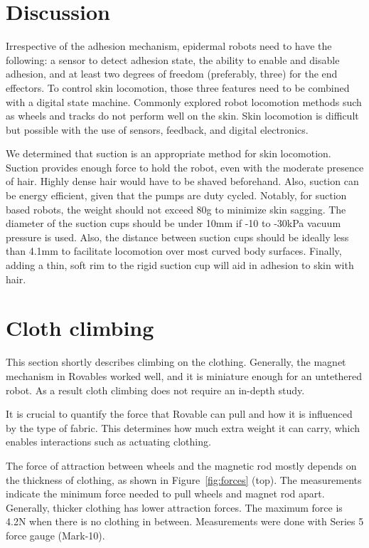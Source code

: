 \section{Discussion}
Irrespective of the adhesion mechanism, epidermal robots need to have the following: a sensor to detect adhesion state, the ability to enable and disable adhesion, and at least two degrees of freedom (preferably, three) for the end effectors. To control skin locomotion, those three features need to be combined with a digital state machine. Commonly explored robot locomotion methods such as wheels and tracks do not perform well on the skin. Skin locomotion is difficult but possible with the use of sensors, feedback, and digital electronics. 

We determined that suction is an appropriate method for skin locomotion. Suction provides enough force to hold the robot, even with the moderate presence of hair. Highly dense hair would have to be shaved beforehand. Also, suction can be energy efficient, given that the pumps are duty cycled. Notably, for suction based robots, the weight should not exceed 80g to minimize skin sagging. The diameter of the suction cups should be under 10mm if -10 to -30kPa vacuum pressure is used. Also, the distance between suction cups should be ideally less than 4.1mm to facilitate locomotion over most curved body surfaces. Finally, adding a thin, soft rim to the rigid suction cup will aid in adhesion to skin with hair. 

\section{Cloth climbing}
This section shortly describes climbing on the clothing. Generally, the magnet mechanism in Rovables worked well, and it is miniature enough for an untethered robot. As a result cloth climbing does not require an in-depth study. 

It is crucial to quantify the force that Rovable can pull and how it is influenced by the type of fabric. This determines how much extra weight it can carry, which enables interactions such as actuating clothing. 

The force of attraction between wheels and the magnetic rod mostly depends on the thickness of clothing, as shown in Figure~\ref{fig:forces} (top). The measurements indicate the minimum force needed to pull wheels and magnet rod apart. Generally, thicker clothing has lower attraction forces. The maximum force is 4.2N when there is no clothing in between. Measurements were done with Series 5 force gauge (Mark-10). 

